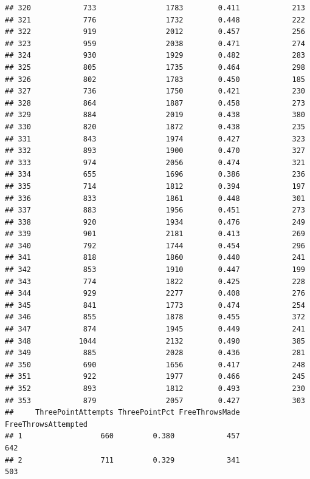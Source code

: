 \documentclass[]{book}
\begin{document}
\begin{verbatim}
## 320            733                1783        0.411            213
## 321            776                1732        0.448            222
## 322            919                2012        0.457            256
## 323            959                2038        0.471            274
## 324            930                1929        0.482            283
## 325            805                1735        0.464            298
## 326            802                1783        0.450            185
## 327            736                1750        0.421            230
## 328            864                1887        0.458            273
## 329            884                2019        0.438            380
## 330            820                1872        0.438            235
## 331            843                1974        0.427            323
## 332            893                1900        0.470            327
## 333            974                2056        0.474            321
## 334            655                1696        0.386            236
## 335            714                1812        0.394            197
## 336            833                1861        0.448            301
## 337            883                1956        0.451            273
## 338            920                1934        0.476            249
## 339            901                2181        0.413            269
## 340            792                1744        0.454            296
## 341            818                1860        0.440            241
## 342            853                1910        0.447            199
## 343            774                1822        0.425            228
## 344            929                2277        0.408            276
## 345            841                1773        0.474            254
## 346            855                1878        0.455            372
## 347            874                1945        0.449            241
## 348           1044                2132        0.490            385
## 349            885                2028        0.436            281
## 350            690                1656        0.417            248
## 351            922                1977        0.466            245
## 352            893                1812        0.493            230
## 353            879                2057        0.427            303
##     ThreePointAttempts ThreePointPct FreeThrowsMade FreeThrowsAttempted
## 1                  660         0.380            457                 642
## 2                  711         0.329            341                 503

\end{verbatim}
\end{document}
